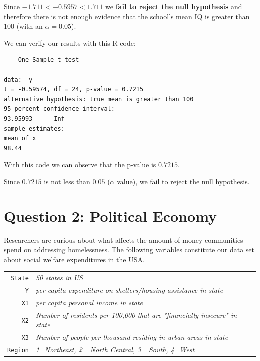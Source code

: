 \documentclass[12pt,letterpaper]{article}
\begin{document}
\begin{enumerate}
Since $-1.711 < -0.5957 < 1.711$ we \textbf{fail to reject the null hypothesis} and therefore there is not enough evidence that the school's mean IQ is greater than $100$ (with an $\alpha = 0.05$).

\vspace{.5cm}

We can verify our results with this R code:



\begin{verbatim}
	One Sample t-test

data:  y
t = -0.59574, df = 24, p-value = 0.7215
alternative hypothesis: true mean is greater than 100
95 percent confidence interval:
93.95993      Inf
sample estimates:
mean of x 
98.44 
\end{verbatim}

With this code we can observe that the p-value is $0.7215$.

Since $0.7215$ is not less than $0.05$ ($\alpha$ value), we fail to reject the null hypothesis.

\end{enumerate}

\newpage

	\section{Question 2: Political Economy}

\noindent Researchers are curious about what affects the amount of money communities spend on addressing homelessness. The following variables constitute our data set about social welfare expenditures in the USA. \\
\vspace{.5cm}


\begin{tabular}{r|l}
	\texttt{State} &\emph{50 states in US} \\
	\texttt{Y} & \emph{per capita expenditure on shelters/housing assistance in state}\\
	\texttt{X1} &\emph{per capita personal income in state} \\
	\texttt{X2} &  \emph{Number of residents per 100,000 that are "financially insecure" in state}\\
	\texttt{X3} &  \emph{Number of people per thousand residing in urban areas in state} \\
	\texttt{Region} &  \emph{1=Northeast, 2= North Central, 3= South, 4=West} \\
\end{tabular}
\end{document}
